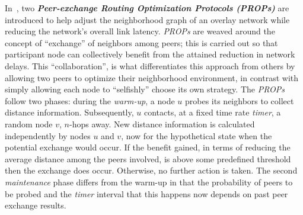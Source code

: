 In~\cite{QCYCZ2007}, two 
\textbf{\emph{Peer-exchange Routing Optimization Protocols (PROPs)}} 
are introduced to help adjust the neighborhood graph of an overlay network
while reducing the network's overall link latency.
\emph{PROPs} are weaved around the concept of
``exchange'' of neighbors among peers; 
this is carried out so that participant node can collectively 
benefit from the attained reduction in network delays. 
This ``collaboration'', is what differentiates this approach 
from others by allowing two peers to optimize
their neighborhood environment, in contrast with simply allowing each node to ``selfishly''
choose its own strategy. 
The \emph{PROPs} follow two phases: during the \emph{warm-up},
a node $u$ probes its neighbors to collect distance information. 
Subsequently, $u$ contacts, at a fixed time rate \emph{timer}, 
a random node $v$, $n$-hops away. %
New distance information is calculated independently 
by nodes $u$ and $v$, now for the
hypothetical state when the potential exchange would occur. 
If the benefit gained, in terms of reducing the average distance among the peers involved, is
above some predefined threshold then the exchange does occur.
Otherwise, no further action is taken. 
The second \emph{maintenance} phase
differs from the warm-up in that the probability
of peers to be probed and the \emph{timer} interval that this happens
now depends on past peer exchange results.

